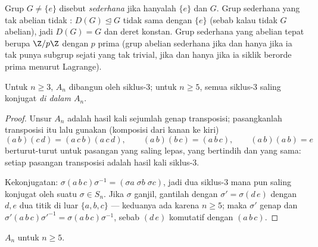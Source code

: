 \begin{definition}\label{def:b3:groups:simple}
Grup $G \neq \{e\}$ disebut \emph{sederhana} jika
 hanyalah $\{e\}$ dan $G$. Grup sederhana yang tak
abelian tidak : $D(G) \trianglelefteq G$ tidak sama dengan $\{e\}$
(sebab kalau tidak $G$ abelian), jadi $D(G) = G$ dan deret 
konstan. Grup sederhana yang abelian tepat berupa $\Z/p\Z$ dengan $p$
prima (grup abelian sederhana jika dan hanya jika ia tak punya subgrup sejati yang tak
trivial, jika dan hanya jika ia siklik berorde prima menurut Lagrange).
\end{definition}

\begin{lemma}\label{lem:b3:groups:threecycles}
Untuk $n \geq 3$, $A_n$ dibangun oleh siklus-$3$; untuk $n \geq 5$,
semua siklus-$3$ saling konjugat \emph{di dalam $A_n$}.
\end{lemma}

\begin{proof}
Unsur $A_n$ adalah hasil kali sejumlah genap
transposisi; pasangkanlah transposisi itu lalu gunakan (komposisi dari kanan ke kiri)
\[
(a\,b)(c\,d) = (a\,c\,b)(a\,c\,d), \qquad
(a\,b)(b\,c) = (a\,b\,c), \qquad
(a\,b)(a\,b) = e
\]
berturut-turut untuk pasangan yang saling lepas, yang bertindih dan yang sama: setiap pasangan
transposisi adalah hasil kali siklus-$3$.

Kekonjugatan: $\sigma(a\,b\,c)\sigma^{-1} = (\sigma a\; \sigma b\;
\sigma c)$, jadi dua siklus-$3$ mana pun saling konjugat oleh suatu $\sigma \in
S_n$. Jika $\sigma$ ganjil, gantilah dengan $\sigma' = \sigma (d\,e)$
dengan $d, e$ dua titik di luar $\{a, b, c\}$ --- keduanya ada
karena $n \geq 5$; maka $\sigma'$ genap dan $\sigma'(a\,b\,c)
\sigma'^{-1} = \sigma(a\,b\,c)\sigma^{-1}$, sebab $(d\,e)$ komutatif
dengan $(a\,b\,c)$.
\end{proof}

\begin{theorem}\label{thm:b3:groups:ansimple}
$A_n$  untuk $n \geq 5$.
\end{theorem}

